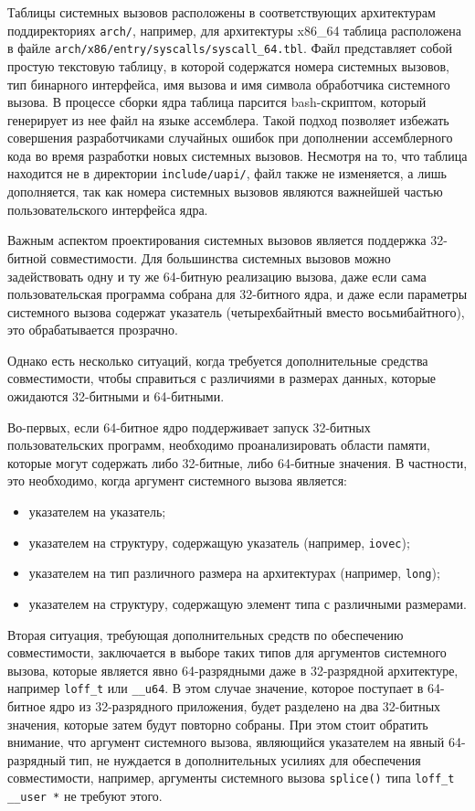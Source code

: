 Таблицы системных вызовов расположены в соответствующих архитектурам
поддиректориях \texttt{arch/}, например, для архитектуры x86\_64 таблица
расположена в файле \texttt{arch/x86/entry/syscalls/syscall\_64.tbl}.
Файл представляет собой простую текстовую таблицу, в которой содержатся
номера системных вызовов, тип бинарного интерфейса, имя вызова и имя символа
обработчика системного вызова. В процессе сборки ядра таблица парсится
bash-скриптом, который генерирует из нее файл на языке ассемблера. Такой подход
позволяет избежать совершения разработчиками случайных ошибок при дополнении
ассемблерного кода во время разработки новых системных вызовов. Несмотря на то,
что таблица находится не в директории \texttt{include/uapi/}, файл также не
изменяется, а лишь дополняется, так как номера системных вызовов являются
важнейшей частью пользовательского интерфейса ядра.

Важным аспектом проектирования системных вызовов является поддержка 32-битной
совместимости. Для большинства системных вызовов можно задействовать одну и ту
же 64-битную реализацию вызова, даже если сама пользовательская программа
собрана для 32-битного ядра, и даже если параметры системного вызова содержат
указатель (четырехбайтный вместо восьмибайтного), это обрабатывается прозрачно.

Однако есть несколько ситуаций, когда требуется дополнительные средства
совместимости, чтобы справиться с различиями в размерах данных, которые
ожидаются  32-битными и 64-битными.

Во-первых, если 64-битное ядро поддерживает запуск 32-битных пользовательских
программ, необходимо проанализировать области памяти, которые могут содержать
либо 32-битные, либо 64-битные значения. В частности, это необходимо, когда
аргумент системного вызова является:
\begin{itemize}
\item указателем на указатель;
\item указателем на структуру, содержащую указатель (например, \texttt{iovec});
\item указателем на тип различного размера на архитектурах (например,
  \texttt{long});
\item указателем на структуру, содержащую элемент типа с различными размерами.
\end{itemize}

Вторая ситуация, требующая дополнительных средств по обеспечению совместимости,
заключается в выборе таких типов для аргументов системного вызова, которые
является явно 64-разрядными даже в 32-разрядной архитектуре, например
\texttt{loff\_t} или \texttt{\_\_u64}. В этом случае значение, которое поступает
в 64-битное ядро из 32-разрядного приложения, будет разделено на два 32-битных
значения, которые затем будут повторно собраны. При этом стоит обратить
внимание, что аргумент системного вызова, являющийся указателем на явный
64-разрядный тип, не нуждается в дополнительных усилиях для обеспечения
совместимости, например, аргументы системного вызова \texttt{splice()} типа
\texttt{loff\_t \_\_user *} не требуют этого.

